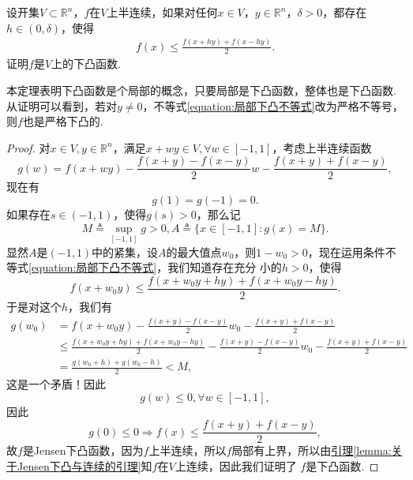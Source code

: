 \documentclass[../../main.tex]{subfiles}%
\begin{document}
\begin{theorem}[下凸函数的局部定义]\label{theorem:下凸函数的局部定义}
设开集\(V\subset\mathbb{R}^n\)，\(f\)在\(V\)上半连续，如果对任何\(x\in V\)，\(y\in\mathbb{R}^n\)，\(\delta>0\)，都存在\(h\in(0,\delta)\)，使得
\begin{align}
f(x)\leqslant\frac{f(x + hy)+f(x - hy)}{2}.\label{equation:局部下凸不等式}
\end{align}
证明\(f\)是\(V\)上的下凸函数.
\end{theorem}
\begin{note}
本定理表明下凸函数是个局部的概念，只要局部是下凸函数，整体也是下凸函数. 从证明可以看到，若对\(y\neq0\)，不等式\eqref{equation:局部下凸不等式}改为严格不等号，则\(f\)也是严格下凸的.
\end{note}
\begin{proof}
对\(x\in V,y\in\mathbb{R}^n\)，满足\(x + wy\in V,\forall w\in[-1,1]\)，考虑上半连续函数
\[
g(w)=f(x + wy)-\frac{f(x + y)-f(x - y)}{2}w-\frac{f(x + y)+f(x - y)}{2},
\]
现在有
\[
g(1)=g(-1)=0.
\]
如果存在\(s\in(-1,1)\)，使得\(g(s)>0\)，那么记
\[
M\triangleq\sup_{[-1,1]}g>0,A\triangleq\{x\in[-1,1]:g(x)=M\}.
\]
显然\(A\)是\((-1,1)\)中的紧集，设\(A\)的最大值点\(w_0\)，则\(1 - w_0>0\)，现在运用条件不等式\eqref{equation:局部下凸不等式}，我们知道存在充分
小的\(h > 0\)，使得
\[
f(x + w_0y)\leqslant\frac{f(x + w_0y+hy)+f(x + w_0y - hy)}{2}.
\]
于是对这个\(h\)，我们有
\begin{align*}
g(w_0)&=f(x + w_0y)-\frac{f(x + y)-f(x - y)}{2}w_0-\frac{f(x + y)+f(x - y)}{2}\\
&\leqslant\frac{f(x + w_0y+hy)+f(x + w_0y - hy)}{2}-\frac{f(x + y)-f(x - y)}{2}w_0-\frac{f(x + y)+f(x - y)}{2}\\
&=\frac{g(w_0 + h)+g(w_0 - h)}{2}<M,
\end{align*}
这是一个矛盾！因此
\[
g(w)\leqslant0,\forall w\in[-1,1],
\]
因此
\[
g(0)\leqslant0\Rightarrow f(x)\leqslant\frac{f(x + y)+f(x - y)}{2},
\]
故\(f\)是Jensen下凸函数，因为\(f\)上半连续，所以\(f\)局部有上界，所以由\hyperref[lemma:关于Jensen下凸与连续的引理]{引理\ref{lemma:关于Jensen下凸与连续的引理}}知\(f\)在\(V\)上连续，因此我们证明了
\(f\)是下凸函数.
\end{proof}
\end{document}
